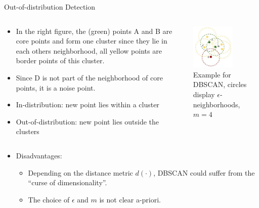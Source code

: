 \documentclass[11pt,compress,t,notes=noshow, aspectratio=169, xcolor=table]{beamer}
\begin{document}
\begin{frame}[c]{Out-of-distribution Detection}
\vspace{-0.6cm}
\begin{columns}
	\begin{column}{0.5\textwidth}
	
		\begin{itemize}
			\item In the right figure, the (green) points A and B are core points and form one cluster since they lie in each others neighborhood, all yellow points are border points of this cluster. 
			\item Since D is not part of the neighborhood of core points, it is a noise point. 
			\item In-distribution: new point lies within a cluster
		    \item Out-of-distribution: new point lies outside the clusters 
		\end{itemize}
	\end{column}
	\begin{column}{0.5\textwidth}
	    \vspace{-2em}
		\begin{center}
			\includegraphics[width=0.6\textwidth]{figure/dbscan.jpg}\\
			\tiny{Example for DBSCAN, circles display $\epsilon$-neighborhoods, $m = 4$}
		\end{center}
	\end{column}
\end{columns}

\begin{itemize}
		\item Disadvantages:
		\begin{itemize}
		    \item Depending on the distance metric $d(\cdot)$, DBSCAN could suffer from the ``curse of dimensionality''. 
		    \item The choice of $\epsilon$ and $m$ is not clear a-priori. 
		\end{itemize}
\end{itemize}
\end{frame}
\end{document}
